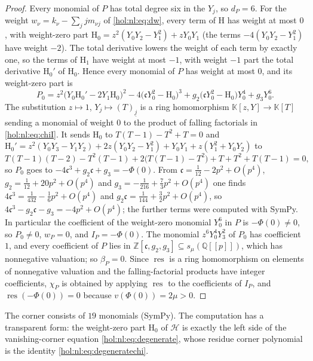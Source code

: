 \documentclass[11pt]{article}
\numberwithin{equation}{section}
\theoremstyle{definition}
\theoremstyle{remark}
\newcommand{\Q}{\mathbb Q}
\newcommand{\Z}{\mathbb Z}
\newcommand{\res}{\operatorname{res}}
\newcommand{\fall}[2]{(#1)_{\underline{#2}}}
\newcommand{\KK}{\mathbb K}
\begin{document}
\begin{proof}
Every monomial of $P$ has total degree six in the $Y_j$, so $d_P=6$. For the
weight $w_\nu=k_\nu-\sum_jjm_{\nu j}$ of \eqref{hol:nl:eq:dw}, every term of
$\mathrm H$ has weight at most $0$, with weight-zero part
$\mathrm H_0=z^2(Y_0Y_2-Y_1^2)+zY_0Y_1$ (the terms
$-4(Y_0Y_2-Y_1^2)$ have weight $-2$). The total derivative lowers the weight of
each term by exactly one, so the terms of $\mathrm H_1$ have weight at most
$-1$, with weight $-1$ part the total derivative $\mathrm H_0'$ of $\mathrm
H_0$. Hence every monomial of $P$ has weight at most $0$, and its weight-zero
part is
\[
 P_0=z^2\bigl(Y_0\mathrm H_0'-2Y_1\mathrm H_0\bigr)^2
 -4\bigl(\mathfrak cY_0^2-\mathrm H_0\bigr)^3
 +g_2\bigl(\mathfrak cY_0^2-\mathrm H_0\bigr)Y_0^4+g_3Y_0^6 .
\]
The substitution $z\mapsto1$, $Y_j\mapsto\fall Tj$ is a ring homomorphism
$\KK[z,Y]\to\KK[T]$ sending a monomial of weight $0$ to the product of
falling factorials in \eqref{hol:nl:eq:chiI}. It sends $\mathrm H_0$ to
$T(T-1)-T^2+T=0$ and $\mathrm H_0'=z^2(Y_0Y_3-Y_1Y_2)+2z(Y_0Y_2-Y_1^2)+Y_0Y_1
+z(Y_1^2+Y_0Y_2)$ to
\[
 T(T-1)(T-2)-T^2(T-1)+2\bigl(T(T-1)-T^2\bigr)+T+T^2+T(T-1)=0,
\]
so $P_0$ goes to $-4\mathfrak c^3+g_2\mathfrak c+g_3=-\Phi(0)$. From
$\mathfrak c=\frac1{12}-2p^2+O(p^4)$, $g_2=\frac1{12}+20p^2+O(p^4)$ and
$g_3=-\frac1{216}+\frac73p^2+O(p^4)$ one finds
$4\mathfrak c^3=\frac1{432}-\frac16p^2+O(p^4)$ and
$g_2\mathfrak c=\frac1{144}+\frac32p^2+O(p^4)$, so
$4\mathfrak c^3-g_2\mathfrak c-g_3=-4p^2+O(p^4)$; the further terms were
computed with SymPy. In particular the coefficient of the weight-zero monomial
$Y_0^6$ in $P$ is $-\Phi(0)\ne0$, so $P_0\ne0$, $w_P=0$, and $I_P=-\Phi(0)$.
The monomial $z^6Y_0^4Y_3^2$ of $P_0$ has coefficient $1$, and every
coefficient of $P$ lies in $\Z[\mathfrak c,g_2,g_3]\subseteq s_\mu(\Q[[p]])$,
which has nonnegative valuation; so $\beta_P=0$. Since $\res$ is a ring
homomorphism on elements of nonnegative valuation and the falling-factorial
products have integer coefficients, $\chi_P$ is obtained by applying $\res$
to the coefficients of $I_P$, and $\res(-\Phi(0))=0$ because
$v(\Phi(0))=2\mu>0$.
\end{proof}

The corner consists of $19$ monomials (SymPy). The computation has a
transparent form: the weight-zero part $\mathrm H_0$ of $\mathcal H$ is
exactly the left side of the vanishing-corner equation
\eqref{hol:nl:eq:degenerate}, whose residue corner polynomial is the identity
\eqref{hol:nl:eq:degeneratechi}.
\end{document}
